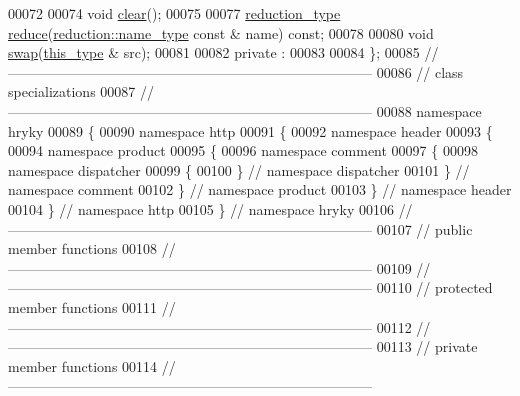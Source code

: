 \begin{DoxyCode}
00072 
00074     \textcolor{keywordtype}{void} \hyperlink{classhryky_1_1http_1_1header_1_1product__comment_1_1dispatcher_1_1_base_a135bce05655e290c78fa83196199a576}{clear}();
00075 
00077     \hyperlink{classhryky_1_1_intrusive_ptr}{reduction_type} \hyperlink{classhryky_1_1http_1_1header_1_1product__comment_1_1dispatcher_1_1_base_a2809ad5f75abd2266e6804e90094bc05}{reduce}(\hyperlink{classhryky_1_1reduction_1_1_string}{reduction::name_type} \textcolor{keyword}{const} & name) \textcolor{keyword}{const};
00078 
00080     \textcolor{keywordtype}{void} \hyperlink{classhryky_1_1http_1_1header_1_1product__comment_1_1dispatcher_1_1_base_ab2b137d16fbe40d839ee136bd5304cab}{swap}(\hyperlink{classhryky_1_1http_1_1header_1_1product__comment_1_1dispatcher_1_1_base}{this_type} & src);
00081 
00082 \textcolor{keyword}{private} :
00083 
00084 \};
00085 \textcolor{comment}{//
      ------------------------------------------------------------------------------}
00086 \textcolor{comment}{// class specializations}
00087 \textcolor{comment}{//
      ------------------------------------------------------------------------------}
00088 \textcolor{keyword}{namespace }hryky
00089 \{
00090 \textcolor{keyword}{namespace }http
00091 \{
00092 \textcolor{keyword}{namespace }header
00093 \{
00094 \textcolor{keyword}{namespace }product
00095 \{
00096 \textcolor{keyword}{namespace }comment
00097 \{
00098 \textcolor{keyword}{namespace }dispatcher
00099 \{
00100 \} \textcolor{comment}{// namespace dispatcher}
00101 \} \textcolor{comment}{// namespace comment}
00102 \} \textcolor{comment}{// namespace product}
00103 \} \textcolor{comment}{// namespace header}
00104 \} \textcolor{comment}{// namespace http}
00105 \} \textcolor{comment}{// namespace hryky}
00106 \textcolor{comment}{//
      ------------------------------------------------------------------------------}
00107 \textcolor{comment}{// public member functions}
00108 \textcolor{comment}{//
      ------------------------------------------------------------------------------}
00109 \textcolor{comment}{//
      ------------------------------------------------------------------------------}
00110 \textcolor{comment}{// protected member functions}
00111 \textcolor{comment}{//
      ------------------------------------------------------------------------------}
00112 \textcolor{comment}{//
      ------------------------------------------------------------------------------}
00113 \textcolor{comment}{// private member functions}
00114 \textcolor{comment}{//
      ------------------------------------------------------------------------------}

\end{DoxyCode}
